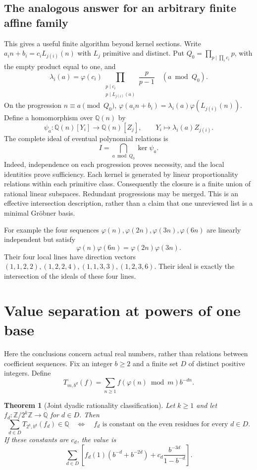 \documentclass[11pt,a4paper]{article}
\newtheorem{theorem}{Theorem}[section]
\theoremstyle{definition}\newtheorem{definition}[theorem]{Definition}
\theoremstyle{remark}\newtheorem{remark}[theorem]{Remark}
\newcommand{\Q}{\mathbb Q}\newcommand{\R}{\mathbb R}\newcommand{\Z}{\mathbb Z}\newcommand{\N}{\mathbb N}
\newcommand{\ph}{\varphi}\newcommand{\rad}{\operatorname{rad}}
\begin{document}
\subsection{The analogous answer for an arbitrary finite affine family}
This gives a useful finite algorithm beyond kernel sections.
Write $a_i n+b_i=c_i L_{j(i)}(n)$ with $L_j$ primitive and distinct.
Put $Q_0=\prod_{p\mid\prod_i c_i}p$, with the empty product equal to one, and
\[
 \lambda_i(a)=\ph(c_i)
 \prod_{\substack{p\mid c_i\\p\mid L_{j(i)}(a)}}\frac p{p-1}
 \quad (a\bmod Q_0).
\]
On the progression $n\equiv a\pmod{Q_0}$,
$\ph(a_i n+b_i)=\lambda_i(a)\ph(L_{j(i)}(n))$.
Define a homomorphism over $\Q(n)$ by
\[
 \psi_a:\Q(n)[Y_i]\longrightarrow\Q(n)[Z_j],
 \qquad Y_i\longmapsto\lambda_i(a)Z_{j(i)}.
\]
The complete ideal of eventual polynomial relations is
\begin{equation}\label{eq:arrangement}
 I=\bigcap_{a\bmod Q_0}\ker\psi_a.
\end{equation}
Indeed, independence on each progression proves necessity, and the local
identities prove sufficiency. Each kernel is generated by linear proportionality
relations within each primitive class. Consequently the closure is a finite
union of rational linear subspaces. Redundant progressions may be merged.
This is an effective intersection description, rather than a claim that one
unreviewed list is a minimal Gr\"obner basis.

For example the four sequences $\ph(n),\ph(2n),\ph(3n),\ph(6n)$ are linearly
independent but satisfy
\[
 \ph(n)\ph(6n)=\ph(2n)\ph(3n).
\]
Their four local lines have direction vectors
$(1,1,2,2),(1,2,2,4),(1,1,3,3),(1,2,3,6)$.
Their ideal is exactly the intersection of the ideals of these four lines.

\section{Value separation at powers of one base}\label{sec:values}
Here the conclusions concern actual real numbers, rather than relations between
coefficient sequences. Fix an integer $b\ge2$ and a finite set $D$ of distinct
positive integers. Define
\[
 T_{m,b^d}(f)=\sum_{n\ge1}f(\ph(n)\bmod m)b^{-dn}.
\]

\begin{theorem}[Joint dyadic rationality classification]\label{thm:joint}
Let $k\ge1$ and let $f_d:\Z/2^k\Z\to\Q$ for $d\in D$. Then
\[
 \sum_{d\in D}T_{2^k,b^d}(f_d)\in\Q
 \quad\Longleftrightarrow\quad
 f_d\text{ is constant on the even residues for every }d\in D.
\]
If these constants are $c_d$, the value is
\[
 \sum_{d\in D}\left[
 f_d(1)(b^{-d}+b^{-2d})+
 c_d\frac{b^{-3d}}{1-b^{-d}}\right].
\]
\end{theorem}
\end{document}
